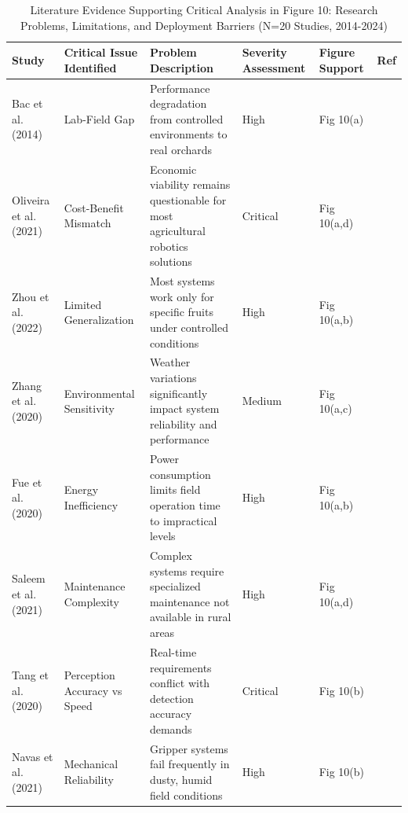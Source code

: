 \documentclass{ieeeaccess}
\begin{document}
\begin{table}[htbp]
\centering
\small
\caption{Literature Evidence Supporting Critical Analysis in Figure 10: Research Problems, Limitations, and Deployment Barriers (N=20 Studies, 2014-2024)}
\label{tab:figure10_support}
\begin{tabular}{p{}p{}p{}p{}p{}p{}}
\toprule
\textbf{Study} & \textbf{Critical Issue Identified} & \textbf{Problem Description} & \textbf{Severity Assessment} & \textbf{Figure Support} & \textbf{Ref} \\ \midrule

Bac et al. (2014) & Lab-Field Gap & Performance degradation from controlled environments to real orchards & High & Fig 10(a) & \cite{bac2014harvesting} \\

Oliveira et al. (2021) & Cost-Benefit Mismatch & Economic viability remains questionable for most agricultural robotics solutions & Critical & Fig 10(a,d) & \cite{oliveira2021advances} \\

Zhou et al. (2022) & Limited Generalization & Most systems work only for specific fruits under controlled conditions & High & Fig 10(a,b) & \cite{zhou2022intelligent} \\

Zhang et al. (2020) & Environmental Sensitivity & Weather variations significantly impact system reliability and performance & Medium & Fig 10(a,c) & \cite{zhang2020technology} \\

Fue et al. (2020) & Energy Inefficiency & Power consumption limits field operation time to impractical levels & High & Fig 10(a,b) & \cite{fue2020extensive} \\

Saleem et al. (2021) & Maintenance Complexity & Complex systems require specialized maintenance not available in rural areas & High & Fig 10(a,d) & \cite{saleem2021automation} \\

Tang et al. (2020) & Perception Accuracy vs Speed & Real-time requirements conflict with detection accuracy demands & Critical & Fig 10(b) & \cite{tang2020recognition} \\

Navas et al. (2021) & Mechanical Reliability & Gripper systems fail frequently in dusty, humid field conditions & High & Fig 10(b) & \cite{navas2021soft} \\


\end{tabular}
\end{table}
\end{document}
